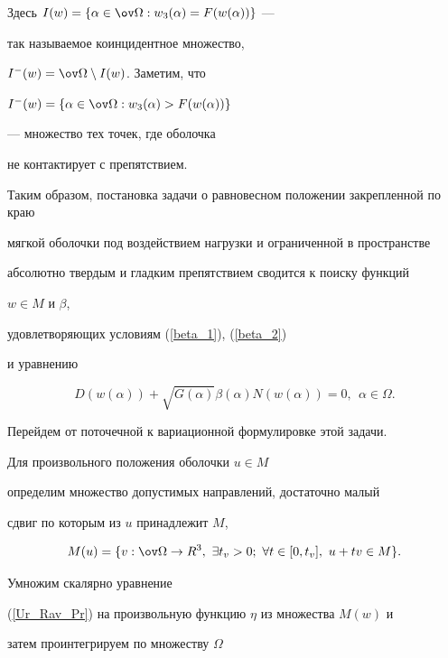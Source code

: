 Здесь $I(w)=\{\alpha \in \ov\Omega : w_3(\alpha )=F(w(\alpha )) \}$ --- 


так называемое коинцидентное множество, 


$I^{-}(w)=\ov\Omega \setminus I(w)$. Заметим, что 


$I^{-}(w)=\{\alpha \in \ov\Omega : w_3(\alpha ) > F(w(\alpha )) \}$


--- множество тех точек, где оболочка


не контактирует с препятствием.





Таким образом, постановка задачи о равновесном положении закрепленной по краю


мягкой оболочки под воздействием нагрузки и ограниченной в пространстве


абсолютно твердым и гладким препятствием сводится к поиску функций


${w \in M}$ и $\beta$,


удовлетворяющих условиям (\ref{beta_1}), (\ref{beta_2})


и уравнению 


\begin{equation}


D(w(\alpha ))+\sqrt {G(\alpha )} \beta(\alpha ) N(w(\alpha ))=0,


\ \ \alpha \in \Omega.


\label{Ur_Rav_Pr}


\end{equation}





Перейдем от поточечной к вариационной формулировке этой задачи.


Для произвольного положения оболочки $u \in M$


определим множество допустимых направлений, достаточно малый 


сдвиг по которым из $u$ принадлежит $M$,


$$


M(u)=\{{v :\ov\Omega\to R^3,\ \exists t_v > 0;


\ \forall t \in [0,t_v],\ u+t v \in M} \} .


$$


Умножим скалярно уравнение


(\ref{Ur_Rav_Pr}) на произвольную функцию $\eta$ из множества $M(w)$ и


затем проинтегрируем по множеству $\Omega$


